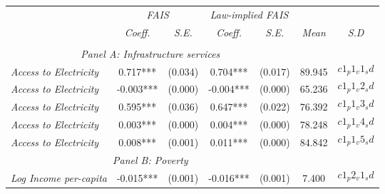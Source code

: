 

\begin{tabular}{lcccccc}

\toprule

\multicolumn{1}{l}{} & \multicolumn{2}{c}{\textit{FAIS}} & \multicolumn{2}{c}{\textit{Law-implied FAIS}} & \multicolumn{2}{c}{\textit{}} \\
\multicolumn{1}{l}{} & \multicolumn{1}{c}{\textit{Coeff.}} & \multicolumn{1}{c}{\textit{S.E.}} & \multicolumn{1}{c}{\textit{Coeff.}} & \multicolumn{1}{c}{\textit{S.E.}} & \multicolumn{1}{c}{\textit{Mean}} & \multicolumn{1}{c}{\textit{S.D}} \\ 
 
\cmidrule(l{1mm}r{1mm}){2-3} \cmidrule(l{1mm}r{1mm}){4-5} \cmidrule(l{1mm}r{1mm}){6-7}  \\

\midrule

\multicolumn{5}{c}{\textit{Panel  A: Infrastructure services}}   \\  

\textit{Access to Electricity}  &  0.717***  
					   & (0.034) 
					   &  0.704***  
					   & (0.017) 
					   &  89.945  
					   &  $$c1_p1_v1_sd$$ \\[0.2cm]
					   
\textit{Access to Electricity}  &  -0.003***  
					   & (0.000) 
					   &  -0.004***  
					   & (0.000) 
					   &  65.236  
					   &  $$c1_p1_v2_sd$$ \\[0.2cm]
					   
\textit{Access to Electricity}  &  0.595***  
					   & (0.036) 
					   &  0.647***  
					   & (0.022) 
					   &  76.392  
					   &  $$c1_p1_v3_sd$$ \\[0.2cm]
					   
\textit{Access to Electricity}  &  0.003***  
					   & (0.000) 
					   &  0.004***  
					   & (0.000) 
					   &  78.248  
					   &  $$c1_p1_v4_sd$$ \\[0.2cm]
					   
\textit{Access to Electricity}  &  0.008***  
					   & (0.001) 
					   &  0.011***  
					   & (0.000) 
					   &  84.842  
					   &  $$c1_p1_v5_sd$$ \\[0.2cm]

\midrule

\multicolumn{5}{c}{\textit{Panel  B: Poverty}}   \\[0.2cm]  

\textit{Log Income per-capita}  &  -0.015***  
					   & (0.001) 
					   &  -0.016***  
					   & (0.001) 
					   &  7.400  
					   &  $$c1_p2_v1_sd$$ \\[0.2cm]
					   

\end{tabular}
